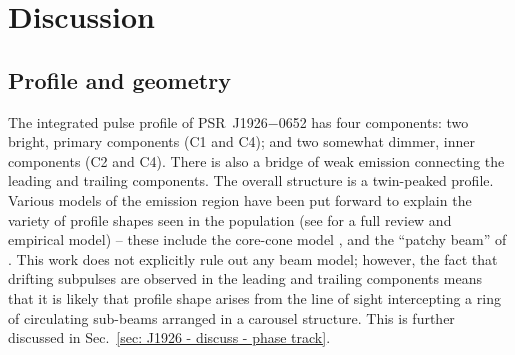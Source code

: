 \section{Discussion}
\label{sec: J1926 - discussion}

\subsection{Profile and geometry}
\label{sec: J1926 - discuss - geometry}

The integrated pulse profile of PSR~J1926$-$0652 has four components: two bright, primary components (C1 and C4); and two somewhat dimmer, inner components (C2 and C4). There is also a bridge of weak emission connecting the leading and trailing components. The overall structure is a twin-peaked profile. Various models of the emission region have been put forward to explain the variety of profile shapes seen in the population (see \citealt{KJxx2007} for a full review and empirical model) -- these include the core-cone model \citep[e.g.][]{Rxxx1983a, Rxxx1986}, and the ``patchy beam'' of \citet{LMxx1988}. This work does not explicitly rule out any beam model; however, the fact that drifting subpulses are observed in the leading and trailing components means that it is likely that profile shape arises from the line of sight intercepting a ring of circulating sub-beams arranged in a carousel structure. This is further discussed in Sec.~\ref{sec: J1926 - discuss - phase track}.


